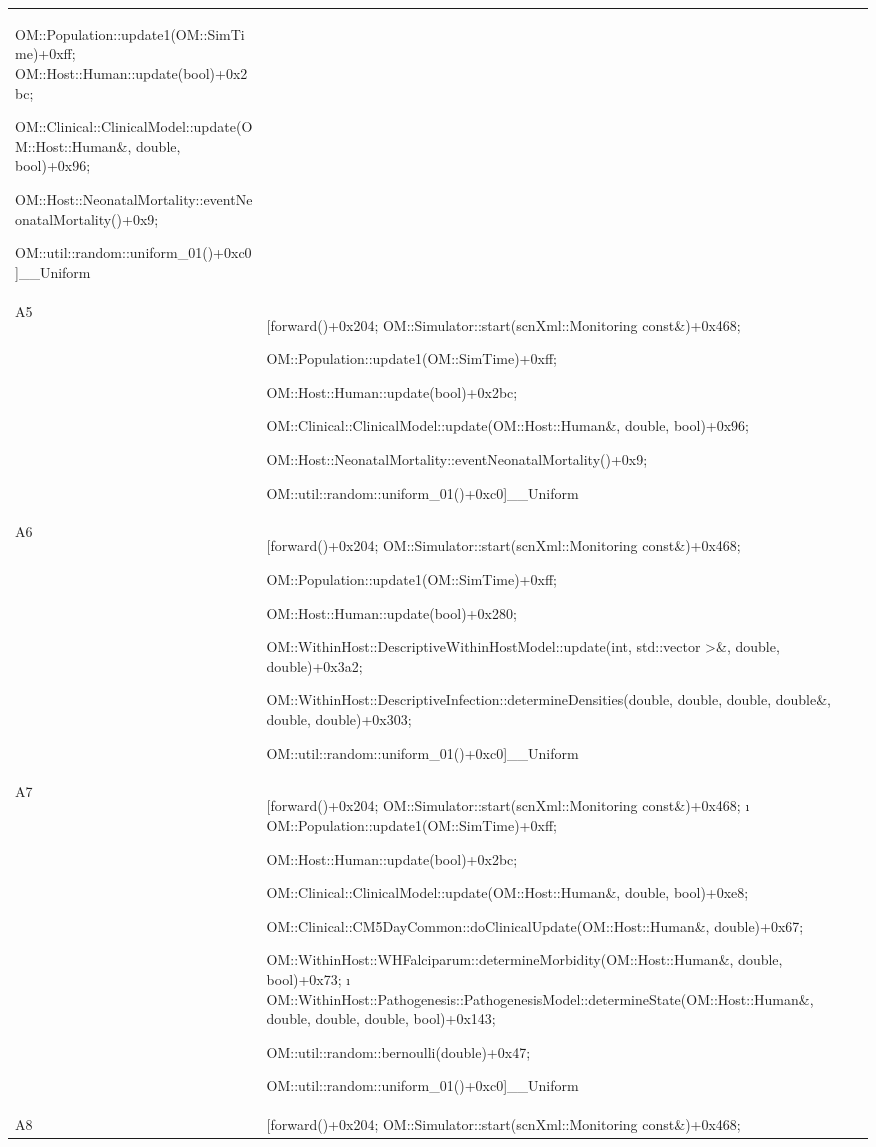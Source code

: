 \documentclass{article}
\begin{document}
\begin{table}[b!]
\begin{tabularx}{\textwidth}{@{}lX@{}}
  OM::Population::update1(OM::SimTime)+0xff; OM::Host::Human::update(bool)+0x2bc;

   OM::Clinical::ClinicalModel::update(OM::Host::Human\&, double, bool)+0x96; 

   OM::Host::NeonatalMortality::eventNeonatalMortality()+0x9;

    OM::util::random::uniform\_01()+0xc0]\_\_Uniform\\
  A5 & [forward()+0x204; OM::Simulator::start(scnXml::Monitoring const\&)+0x468;

   OM::Population::update1(OM::SimTime)+0xff;

    OM::Host::Human::update(bool)+0x2bc;

    OM::Clinical::ClinicalModel::update(OM::Host::Human\&, double, bool)+0x96;

    OM::Host::NeonatalMortality::eventNeonatalMortality()+0x9;

    OM::util::random::uniform\_01()+0xc0]\_\_Uniform\\
  A6 & [forward()+0x204; OM::Simulator::start(scnXml::Monitoring const\&)+0x468;

   OM::Population::update1(OM::SimTime)+0xff;

   OM::Host::Human::update(bool)+0x280;

   OM::WithinHost::DescriptiveWithinHostModel::update(int, std::vector \textgreater{}\&, double, double)+0x3a2;

   OM::WithinHost::DescriptiveInfection::determineDensities(double, double, double, double\&, double, double)+0x303;

   OM::util::random::uniform\_01()+0xc0]\_\_Uniform\\
   A7 & [forward()+0x204; OM::Simulator::start(scnXml::Monitoring const\&)+0x468;
   ı
	OM::Population::update1(OM::SimTime)+0xff;

	OM::Host::Human::update(bool)+0x2bc;

	OM::Clinical::ClinicalModel::update(OM::Host::Human\&, double, bool)+0xe8;

	OM::Clinical::CM5DayCommon::doClinicalUpdate(OM::Host::Human\&, double)+0x67;

	OM::WithinHost::WHFalciparum::determineMorbidity(OM::Host::Human\&, double, bool)+0x73;
ı
	OM::WithinHost::Pathogenesis::PathogenesisModel::determineState(OM::Host::Human\&, double, double, double, bool)+0x143;

	OM::util::random::bernoulli(double)+0x47;

	OM::util::random::uniform\_01()+0xc0]\_\_Uniform\\
	A8 & [forward()+0x204; OM::Simulator::start(scnXml::Monitoring const\&)+0x468;


\end{tabularx}
\end{table}
\end{document}
